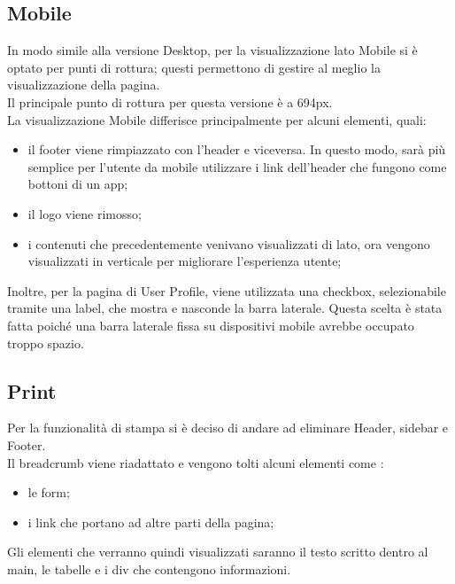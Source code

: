   \subsection{Mobile}
    In modo simile alla versione Desktop, per la visualizzazione lato Mobile si è optato per punti di rottura; questi permettono di gestire al meglio la visualizzazione della pagina. \\
    Il principale punto di rottura per questa versione è a 694px. \\
    La visualizzazione Mobile differisce principalmente per alcuni elementi, quali:
    \begin{itemize}
      \item il footer viene rimpiazzato con l'header e viceversa. In questo modo, sarà più semplice per l'utente da mobile utilizzare i link dell'header che fungono come bottoni di un app;
      \item il logo viene rimosso;
      \item i contenuti che precedentemente venivano visualizzati di lato, ora vengono visualizzati in verticale per migliorare l'esperienza utente;
    \end{itemize}
    Inoltre, per la pagina di User Profile, viene utilizzata una checkbox, selezionabile tramite una label, che mostra e nasconde la barra laterale. Questa scelta è stata fatta poiché una barra
    laterale fissa su dispositivi mobile avrebbe occupato troppo spazio.
  
  \subsection{Print}
    Per la funzionalità di stampa si è deciso di andare ad eliminare Header, sidebar e Footer. \\
    Il breadcrumb viene riadattato e vengono tolti alcuni elementi come :
    \begin{itemize}
      \item le form;
      \item i link che portano ad altre parti della pagina;
    \end{itemize}
    Gli elementi che verranno quindi visualizzati saranno il testo scritto dentro al main, le tabelle e i div che contengono informazioni.